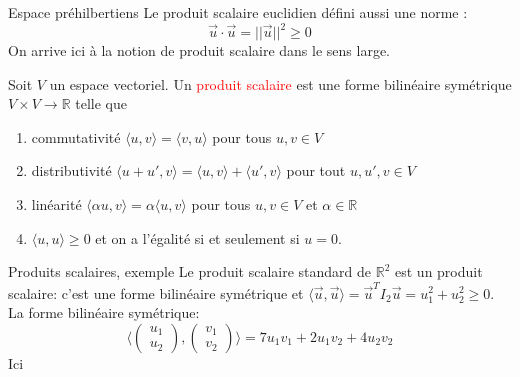         \begin{parag}{Espace préhilbertiens}
            Le produit scalaire euclidien défini aussi une norme :
            \[\vec{u}\cdot \vec{u} = ||\vec{u}||^2 \geq 0\]
            On arrive ici à la notion de produit scalaire dans le sens large.
            \begin{definition}
                Soit $V$ un espace vectoriel. Un \textcolor{red}{produit scalaire} est une forme bilinéaire symétrique $V \times V \to \mathbb{R}$ telle que 
                \begin{enumerate}
                    \item commutativité $\langle u, v \rangle = \langle v, u\rangle$ pour tous $u, v \in V$
                    \item distributivité $\langle u + u', v\rangle = \langle u, v \rangle + \langle u', v \rangle$ pour tout $u, u', v \in V$
                    \item linéarité $\langle \alpha u, v \rangle = \alpha \langle u, v \rangle$ pour tous $u, v \in V$ et $\alpha \in \mathbb{R}$
                    \item  $\langle u, u \rangle \geq 0$ et on a l'égalité si et seulement si $u = 0$.
                \end{enumerate}
            \end{definition}
            \begin{subparag}{Produits scalaires, exemple}
                Le produit scalaire standard de $\mathbb{R}^2$ est un produit scalaire: c'est une forme bilinéaire symétrique et $\langle \vec{u}, \vec{u}\rangle = \vec{u}^TI_2\vec{u} = u_1^2 + u_2^2 \geq 0$.
                \\
                La forme bilinéaire symétrique:
                \[\langle\begin{pmatrix}
                    u_1 \\ u_2
                \end{pmatrix}, \begin{pmatrix}
                    v_1 \\ v_2
                \end{pmatrix}\rangle = 7u_1v_1 + 2u_1v_2 + 4u_2v_2\]
                Ici
                \begin{align*}
                    

\end{align*}
\end{subparag}
\end{parag}
